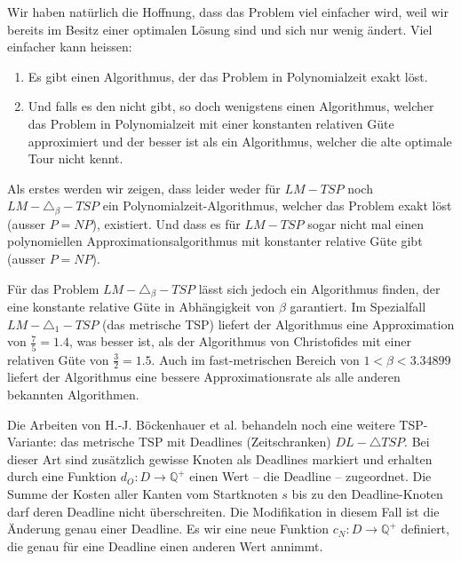 \documentclass[a4paper,11pt]{scrreprt}
\begin{document}
Wir haben natürlich die Hoffnung, dass das Problem viel einfacher wird, weil wir bereits im Besitz einer optimalen Lösung sind und sich nur wenig ändert. Viel einfacher kann heissen:

\begin{enumerate}
\item Es gibt einen Algorithmus, der das Problem in Polynomialzeit exakt löst.
\item Und falls es den nicht gibt, so doch wenigstens einen Algorithmus, welcher das Problem in Polynomialzeit mit einer konstanten relativen Güte approximiert und der besser ist als ein Algorithmus, welcher die alte optimale Tour nicht kennt.
\end{enumerate}

Als erstes werden wir zeigen, dass leider weder für $LM - TSP$ noch $LM - \triangle_\beta - TSP$ ein Polynomialzeit-Algorithmus, welcher das Problem exakt löst (ausser $P = NP$), existiert. Und dass es für $LM - TSP$ sogar nicht mal einen polynomiellen Approximationsalgorithmus mit konstanter relative Güte gibt (ausser $P = NP$).

Für das Problem $LM - \triangle_\beta - TSP$ lässt sich jedoch ein Algorithmus finden, der eine konstante relative Güte in Abhängigkeit von $\beta$ garantiert. Im Spezialfall $ LM - \triangle_1 - TSP$ (das metrische TSP) liefert der Algorithmus eine Approximation von $\frac{7}{5} = 1.4$, was besser ist, als der Algorithmus von Christofides mit einer relativen Güte von $\frac{3}{2} = 1.5$. Auch im fast-metrischen Bereich von $1 < \beta < 3.34899$ liefert der Algorithmus eine bessere Approximationsrate als alle anderen bekannten Algorithmen.

Die Arbeiten von H.-J. Böckenhauer et al. behandeln noch eine weitere TSP-Variante: das metrische TSP mit Deadlines (Zeitschranken) $DL - \triangle TSP$. Bei dieser Art sind zusätzlich gewisse Knoten als Deadlines markiert und erhalten durch eine Funktion $d_O: D \rightarrow \mathbb{Q}^+$ einen Wert -- die Deadline -- zugeordnet. Die Summe der Kosten aller Kanten vom Startknoten $s$ bis zu den Deadline-Knoten darf deren Deadline nicht überschreiten. Die Modifikation in diesem Fall ist die Änderung genau einer Deadline. Es wir eine neue Funktion $c_N: D \rightarrow \mathbb{Q}^+$ definiert, die genau für eine Deadline einen anderen Wert annimmt. 
\end{document}
